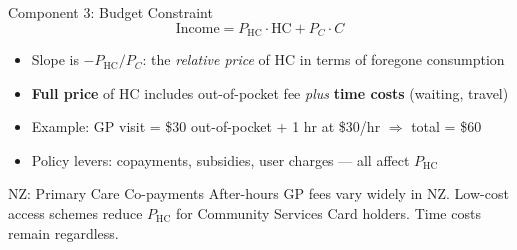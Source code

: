 \documentclass[aspectratio=169, 12pt]{beamer}
\begin{document}
\begin{frame}{Component 3: Budget Constraint}
  $$\text{Income} = P_\text{HC} \cdot \text{HC} + P_C \cdot C$$
  \small
  \begin{itemize}
    \item Slope is $-P_\text{HC}/P_C$: the \emph{relative price} of HC in terms of foregone
          consumption
    \item \textbf{Full price} of HC includes out-of-pocket fee \emph{plus} \textbf{time costs}
          (waiting, travel)
    \item Example: GP visit = \$30 out-of-pocket + 1 hr at \$30/hr $\Rightarrow$ total = \$60
    \item Policy levers: copayments, subsidies, user charges --- all affect $P_\text{HC}$
  \end{itemize}
  \vspace{0.2em}
  \begin{exampleblock}{NZ: Primary Care Co-payments}
    \small After-hours GP fees vary widely in NZ. Low-cost access schemes reduce $P_\text{HC}$
    for Community Services Card holders. Time costs remain regardless.
  \end{exampleblock}
\end{frame}

\end{document}
